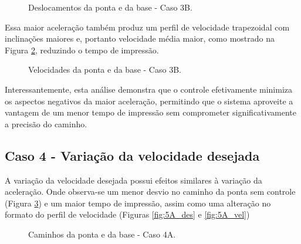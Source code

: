 \begin{figure}[H]
    \centering
    \hfill
    \caption{Deslocamentos da ponta e da base - Caso 3B.}
    \label{fig:3B_des}
\end{figure}

Essa maior aceleração também produz um perfil de velocidade trapezoidal com inclinações maiores e, portanto velocidade média maior, como mostrado na Figura \ref{fig:3B_vel}, reduzindo o tempo de impressão.

\begin{figure}[H]
    \centering
    \hfill
    \caption{Velocidades da ponta e da base - Caso 3B.}
    \label{fig:3B_vel}
\end{figure}

Interessantemente, esta análise demonstra que o controle efetivamente minimiza os aspectos negativos da maior aceleração, permitindo que o sistema aproveite a vantagem de um menor tempo de impressão sem comprometer significativamente a precisão do caminho.


\subsection{Caso 4 - Variação da velocidade desejada}
A variação da velocidade desejada possui efeitos similares à variação da aceleração. Onde observa-se um menor desvio no caminho da ponta sem controle (Figura \ref{fig:5A_cam}) e um maior tempo de impressão, assim como uma alteração no formato do perfil de velocidade (Figuras \ref{fig:5A_des} e \ref{fig:5A_vel})

\begin{figure}[H]
    \centering
    \hfill
    \hfill
    \hfill
    \caption{Caminhos da ponta e da base - Caso 4A.}
    \label{fig:5A_cam}
\end{figure}

